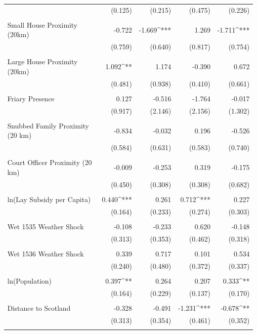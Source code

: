 \begin{table}[H]
\begin{tabular}{@{\extracolsep{.5pt}}lD{.}{.}{-3} D{.}{.}{-3} D{.}{.}{-3} D{.}{.}{-3} }
  & (0.125) & (0.215) & (0.475) & (0.226) \\ 
  & & & & \\ 
 Small House Proximity (20km) & -0.722 & -1.669^{***} & 1.269 & -1.711^{***} \\ 
  & (0.759) & (0.640) & (0.817) & (0.754) \\ 
  & & & & \\ 
 Large House Proximity (20km) & 1.092^{**} & 1.174 & -0.390 & 0.672 \\ 
  & (0.481) & (0.938) & (0.410) & (0.661) \\ 
  & & & & \\ 
 Friary Presence & 0.127 & -0.516 & -1.764 & -0.017 \\ 
  & (0.917) & (2.146) & (2.156) & (1.302) \\ 
  & & & & \\ 
 Snubbed Family Proximity (20 km) & -0.834 & -0.032 & 0.196 & -0.526 \\ 
  & (0.584) & (0.631) & (0.583) & (0.740) \\ 
  & & & & \\ 
 Court Officer Proximity (20 km) & -0.009 & -0.253 & 0.319 & -0.175 \\ 
  & (0.450) & (0.308) & (0.308) & (0.682) \\ 
  & & & & \\ 
 ln(Lay Subsidy per Capita) & 0.440^{***} & 0.261 & 0.712^{***} & 0.227 \\ 
  & (0.164) & (0.233) & (0.274) & (0.303) \\ 
  & & & & \\ 
 Wet 1535 Weather Shock & -0.108 & -0.233 & 0.620 & -0.148 \\ 
  & (0.313) & (0.353) & (0.462) & (0.318) \\ 
  & & & & \\ 
 Wet 1536 Weather Shock & 0.339 & 0.717 & 0.101 & 0.534 \\ 
  & (0.240) & (0.480) & (0.372) & (0.337) \\ 
  & & & & \\ 
 ln(Population) & 0.397^{**} & 0.264 & 0.207 & 0.333^{**} \\ 
  & (0.164) & (0.229) & (0.137) & (0.170) \\ 
  & & & & \\ 
 Distance to Scotland & -0.328 & -0.491 & -1.231^{***} & -0.678^{**} \\ 
  & (0.313) & (0.354) & (0.461) & (0.352) \\ 
  & & & & \\ 

\end{tabular}
\end{table}
